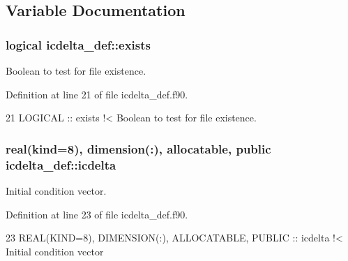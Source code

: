 \subsection{Variable Documentation}
\subsubsection[{\texorpdfstring{exists}{exists}}]{\setlength{\rightskip}{0pt plus 5cm}logical icdelta\+\_\+def\+::exists\hspace{0.3cm}{\ttfamily [private]}}\hypertarget{namespaceicdelta__def_a3d6fe1a548a46a14b09fd3313b9e3546}{}\label{namespaceicdelta__def_a3d6fe1a548a46a14b09fd3313b9e3546}


Boolean to test for file existence. 



Definition at line 21 of file icdelta\+\_\+def.\+f90.


\begin{DoxyCode}
21   \textcolor{keywordtype}{LOGICAL} :: exists\textcolor{comment}{ !< Boolean to test for file existence.}
\end{DoxyCode}
\subsubsection[{\texorpdfstring{icdelta}{icdelta}}]{\setlength{\rightskip}{0pt plus 5cm}real(kind=8), dimension(\+:), allocatable, public icdelta\+\_\+def\+::icdelta}\hypertarget{namespaceicdelta__def_a1ced9e0fa24222e5dc2f79996864b7da}{}\label{namespaceicdelta__def_a1ced9e0fa24222e5dc2f79996864b7da}


Initial condition vector. 



Definition at line 23 of file icdelta\+\_\+def.\+f90.


\begin{DoxyCode}
23   \textcolor{keywordtype}{REAL(KIND=8)}, \textcolor{keywordtype}{DIMENSION(:)}, \textcolor{keywordtype}{ALLOCATABLE}, \textcolor{keywordtype}{PUBLIC} :: icdelta\textcolor{comment}{ !< Initial condition vector}
\end{DoxyCode}
